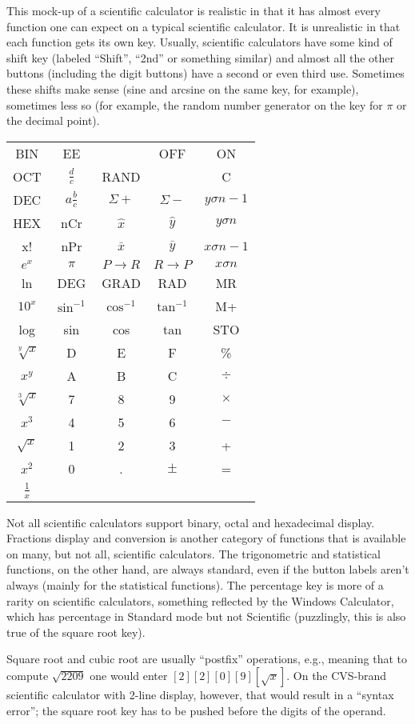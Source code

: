 \documentclass[12pt]{article}
\begin{document}
This mock-up of a scientific calculator is realistic in that it has almost every function one can expect on a typical scientific calculator. It is unrealistic in that each function gets its own key. Usually, scientific calculators have some kind of shift key (labeled ``Shift'', ``2nd'' or something similar) and almost all the other buttons (including the digit buttons) have a second or even third use. Sometimes these shifts make sense (sine and arcsine on the same key, for example), sometimes less so (for example, the random number generator on the key for $\pi$ or the decimal point).

\begin{tabular}{|c|c|c|c|c|}
BIN & EE & & OFF & ON \\
OCT & $\frac{d}{c}$ & RAND & & C \\
DEC & $a \frac{b}{c}$ & $\Sigma +$ & $\Sigma -$ & $y\sigma n - 1$ \\
HEX & nCr & $\hat{x}$ & $\hat{y}$ & $y\sigma n$ \\
x! & nPr & $\bar{x}$ & $\bar{y}$ & $x\sigma n - 1$ \\
$e^x$ & $\pi$ & $P \to R$ & $R \to P$ & $x\sigma n$ \\
ln & DEG & GRAD & RAD & MR \\
$10^x$ & $\sin^{-1}$ & $\cos^{-1}$ & $\tan^{-1}$ & M+ \\
log & sin & cos & tan & STO \\
$\sqrt[y]{x}$ & D & E & F & \% \\
$x^y$ & A & B & C & $\div$ \\
$\sqrt[3]{x}$ & 7 & 8 & 9 & $\times$ \\
$x^3$ & 4 & 5 & 6 & $-$ \\
$\sqrt{x}$ & 1 & 2 & 3 & + \\
$x^2$ & 0 & . & $\pm$ & = \\
$\frac{1}{x}$ & & & & \\
\end{tabular}

Not all scientific calculators support binary, octal and hexadecimal display. Fractions display and conversion is another category of functions that is available on many, but not all, scientific calculators. The trigonometric and statistical functions, on the other hand, are always standard, even if the button labels aren't always (mainly for the statistical functions). The percentage key is more of a rarity on scientific calculators, something reflected by the Windows Calculator, which has percentage in Standard mode but not Scientific (puzzlingly, this is also true of the square root key).

Square root and cubic root are usually ``postfix'' operations, e.g., meaning that to compute $\sqrt{2209}$ one would enter $[2] [2] [0] [9] [\sqrt{x}]$. On the CVS-brand scientific calculator with 2-line display, however, that would result in a ``syntax error''; the square root key has to be pushed before the digits of the operand.
\end{document}
